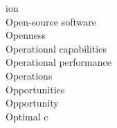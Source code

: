\documentclass[a4paper]{article}
\begin{document}
\begin{multicols*}{2}
\begin{footnotesize}
ion \\ Open-source software \\ Openness \\ Operational capabilities \\ Operational performance \\ Operations \\ Opportunities \\ Opportunity \\ Optimal c
\end{footnotesize}
\end{multicols*}
\end{document}
